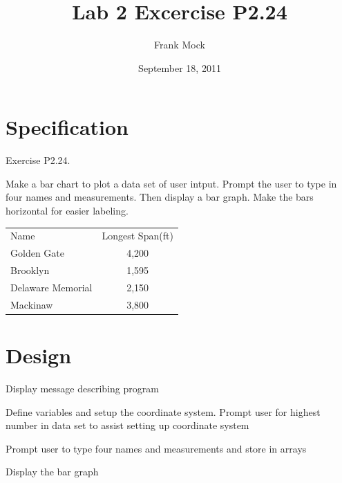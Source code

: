\documentclass{article}
\begin{document}
\setlength{\parindent}{0in}
\title{\color{blue}Lab 2 Excercise P2.24}
\author{\color{blue}Frank Mock}
\date{\color{blue}September 18, 2011}
\maketitle
\section{Specification}

Exercise P2.24.
      
Make a bar chart to plot a data set of user intput.
Prompt the user to type in four names and measurements. 
Then display a bar graph. Make the bars horizontal for easier labeling.\\
\begin{tabular}{lc}
Name & Longest Span(ft) \\
Golden Gate & 4,200 \\
Brooklyn & 1,595 \\
Delaware Memorial & 2,150 \\
Mackinaw &3,800 
\end{tabular}
\section{Design}
\begin{enumeration}
\item Display message describing program
\item Define variables and setup the coordinate system. Prompt user for 
highest number in data set to assist setting up coordinate system
\item Prompt user to type four names and measurements and store in arrays
\item Display the bar graph
\end{enumeration}
\end{document}
